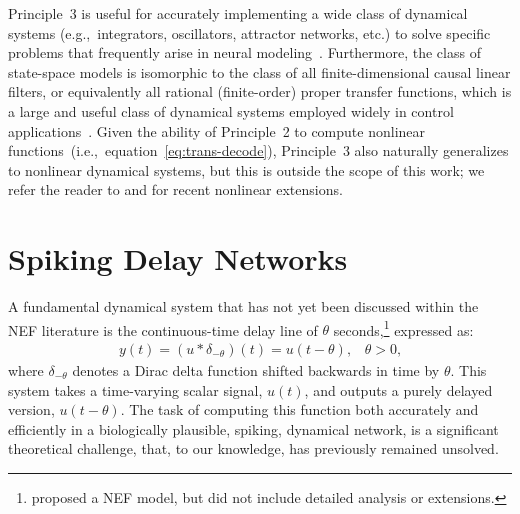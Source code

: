 \documentclass[12pt]{article}
\theoremstyle{definition}
\begin{document}
Principle~3 is useful for accurately implementing a wide class of dynamical systems (e.g.,~integrators, oscillators, attractor networks, etc.) to solve specific problems that frequently arise in neural modeling~\citep[e.g.,][]{eliasmith2000b, singh2004, eliasmith2005b, singh2006}.
Furthermore, the class of state-space models is isomorphic to the class of all finite-dimensional causal linear filters, or equivalently all rational (finite-order) proper transfer functions, which is a large and useful class of dynamical systems employed widely in control applications~\citep{brogan1982modern}.
Given the ability of Principle~2 to compute nonlinear functions~(i.e.,~equation~\ref{eq:trans-decode}), Principle~3 also naturally generalizes to nonlinear dynamical systems, but this is outside the scope of this work; we refer the reader to \citet{voelker2017iscas} and \citet{voelker2017neuromorphic} for recent nonlinear extensions.

\section{Spiking Delay Networks}
\label{sec:delay}

A fundamental dynamical system that has not yet been discussed within the NEF literature is the continuous-time delay line of $\theta$ seconds,\footnote{
\citet{voelker2015computing} proposed a NEF model, but did not include detailed analysis or extensions.
}
expressed as:
\begin{align} \label{eq:time-delay}
y(t) = (u \ast \delta_{-\theta})(t) = u(t - \theta)\text{,} \quad \theta > 0 \text{,}
\end{align}
where $\delta_{-\theta}$ denotes a Dirac delta function shifted backwards in time by $\theta$.
This system takes a time-varying scalar signal, $u(t)$, and outputs a purely delayed version, $u(t - \theta)$.
The task of computing this function both accurately and efficiently in a biologically plausible, spiking, dynamical network, is a significant theoretical challenge, that, to our knowledge, has previously remained unsolved.
\end{document}
